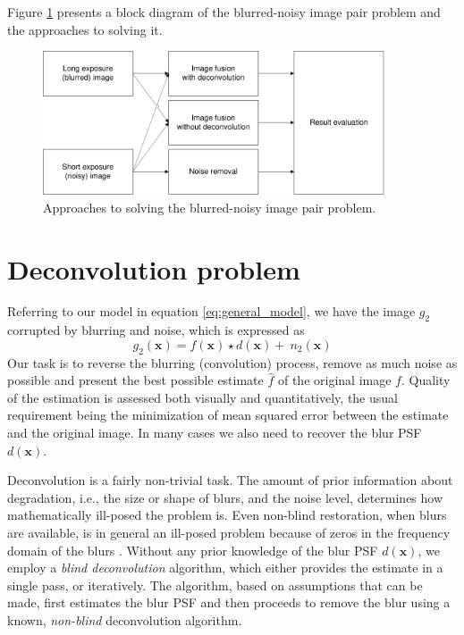 \documentclass[12pt,notitlepage]{report}
\begin{document}
Figure \ref{fig:general_methods_overview} presents a block diagram of the blurred-noisy image pair problem and the approaches to solving it.
%
\begin{figure}[htb]
 \centering
 \includegraphics[width=0.9\textwidth]{general_methods_overview.pdf}
 \caption[Approaches to solving the blurred-noisy image pair problem]{Approaches to solving the blurred-noisy image pair problem.}
 \label{fig:general_methods_overview}
\end{figure}
%

\section{Deconvolution problem}
\label{sec:the_deconvolution_problem}

Referring to our model in equation \ref{eq:general_model}, we have the image $g_2$ corrupted by blurring and noise, which is expressed as 
\begin{equation}
	\label{eq:deconvolution_problem}
		g_2(\mathbf{x}) = f(\mathbf{x}) \star d(\mathbf{x}) + \ n_2(\mathbf{x}) 
\end{equation}
Our task is to reverse the blurring (convolution) process, remove as much noise as possible and present the best possible estimate $\hat{f}$ of the original image $f$. Quality of the estimation is assessed both visually and quantitatively, the usual requirement being the minimization of mean squared error between the estimate and the original image. In many cases we also need to recover the blur PSF $d(\mathbf{x})$. 

Deconvolution is a fairly non-trivial task. The amount of prior information about degradation, i.e., the size or shape of blurs, and the noise level, determines how mathematically ill-posed the problem is. 
Even non-blind restoration, when blurs are available, is in general an ill-posed problem because of zeros in the frequency domain of the blurs \cite{srou03}. Without any prior knowledge of the blur PSF $d(\mathbf{x})$, we employ a {\em blind deconvolution} algorithm,  which either provides the estimate in a single pass, or iteratively. The algorithm, based on assumptions that can be made, first estimates the blur PSF and then proceeds to remove the blur using a known, {\em non-blind} deconvolution algorithm.  
\end{document}
